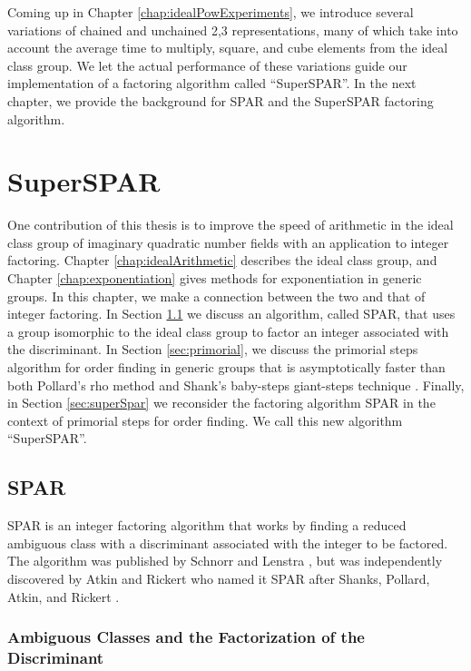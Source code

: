 \documentclass{ucalgthes1}
\theoremstyle{definition}
\begin{document}
Coming up in Chapter \ref{chap:idealPowExperiments}, we introduce several variations of chained and unchained 2,3 representations, many of which take into account the average time to multiply, square, and cube elements from the ideal class group.  We let the actual performance of these variations guide our implementation of a factoring algorithm called ``SuperSPAR''.  In the next chapter, we provide the background for SPAR and the SuperSPAR factoring algorithm.


\chapter{SuperSPAR}
\label{chap:superspar}

One contribution of this thesis is to improve the speed of arithmetic in the ideal class group of imaginary quadratic number fields with an application to integer factoring.  Chapter \ref{chap:idealArithmetic} describes the ideal class group, and Chapter \ref{chap:exponentiation} gives methods for exponentiation in generic groups.  In this chapter, we make a connection between the two and that of integer factoring.  In Section \ref{sec:spar} we discuss an algorithm, called SPAR, that uses a group isomorphic to the ideal class group to factor an integer associated with the discriminant.  In Section \ref{sec:primorial}, we discuss the primorial steps algorithm for order finding in generic groups that is asymptotically faster than both Pollard's rho method \cite{Pollard1975} and Shank's baby-steps giant-steps technique \cite{Shanks1971}.  Finally, in Section \ref{sec:superSpar} we reconsider the factoring algorithm SPAR in the context of primorial steps for order finding.  We call this new algorithm ``SuperSPAR''.

\section{SPAR}
\label{sec:spar}

SPAR is an integer factoring algorithm that works by finding a reduced ambiguous class with a discriminant associated with the integer to be factored.  The algorithm was published by Schnorr and Lenstra \cite{Schnorr1984}, but was independently discovered by Atkin and Rickert who named it SPAR after Shanks, Pollard, Atkin, and Rickert \cite[p.182]{Jacobson1999}.

\subsection{Ambiguous Classes and the Factorization of the Discriminant}
\label{subsec:forms}
\end{document}
